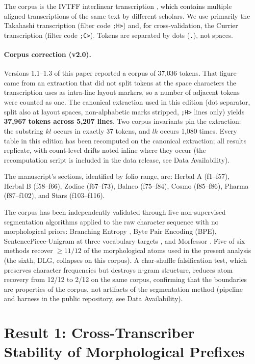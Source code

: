 \documentclass[11pt,a4paper]{article}
\begin{document}
The corpus is the IVTFF interlinear transcription \citep{Zandbergen2022}, which contains multiple aligned transcriptions of the same text by different scholars. We use primarily the Takahashi transcription (filter code \verb|;H>|) and, for cross-validation, the Currier transcription (filter code \verb|;C>|). Tokens are separated by dots (\verb|.|), not spaces.

\paragraph{Corpus correction (v2.0).} Versions 1.1--1.3 of this paper reported a corpus of 37{,}036 tokens. That figure came from an extraction that did not split tokens at the space characters the transcription uses as intra-line layout markers, so a number of adjacent tokens were counted as one. The canonical extraction used in this edition (dot separator, split also at layout spaces, non-alphabetic marks stripped, \verb|;H>| lines only) yields \textbf{37{,}967 tokens across 5{,}207 lines}. Two corpus invariants pin the extraction: the substring $kl$ occurs in exactly 37 tokens, and $lk$ occurs 1{,}080 times. Every table in this edition has been recomputed on the canonical extraction; all results replicate, with count-level drifts noted inline where they occur (the recomputation script is included in the data release, see Data Availability).

The manuscript's sections, identified by folio range, are: Herbal A (f1--f57), Herbal B (f58--f66), Zodiac (f67--f73), Balneo (f75--f84), Cosmo (f85--f86), Pharma (f87--f102), and Stars (f103--f116).

The corpus has been independently validated through five non-supervised segmentation algorithms applied to the raw character sequence with no morphological priors: Branching Entropy \citep{TanakaIshii2005}, Byte Pair Encoding (BPE), SentencePiece-Unigram at three vocabulary targets \citep{Kudo2018}, and Morfessor \citep{CreutzLagus2007}. Five of six methods recover $\geq 11/12$ of the morphological atoms used in the present analysis (the sixth, DLG, collapses on this corpus). A char-shuffle falsification test, which preserves character frequencies but destroys n-gram structure, reduces atom recovery from 12/12 to 2/12 on the same corpus, confirming that the boundaries are properties of the corpus, not artifacts of the segmentation method (pipeline and harness in the public repository, see Data Availability).

\section{Result 1: Cross-Transcriber Stability of Morphological Prefixes}
\end{document}
